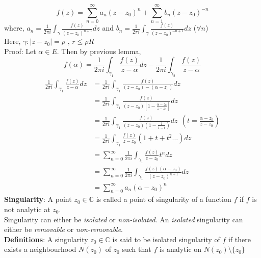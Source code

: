 \begin{equation*}
    f(z)=\sum_{n=0}^{\infty} a_n(z-z_0)^n + \sum_{n=1}^{\infty} b_n(z-z_0)^{-n}
\end{equation*}
where, $a_n=\frac{1}{2\pi i} \int_{\gamma}^{} \frac{f(z)}{(z-z_0)^{n+1}} dz$ and $b_n= \frac{1}{2\pi i} \int_{\gamma}^{} \frac{f(z)}{(z-z_0)^{-n+1}} dz$ ($\forall n$)\\
Here, $\gamma: |z-z_0|=\rho$ , $r\leq \rho R$\\
Proof: Let $\alpha \in E$. Then by previous lemma, \\
\begin{equation*}
    f(\alpha)= \frac{1}{2\pi i} \int_{\gamma_1}^{} \frac{f(z)}{z-\alpha} dz - \frac{1}{2\pi i}\int_{\gamma_2}^{} \frac{f(z)}{z-\alpha}
\end{equation*}
\begin{equation*}
    \begin{split}
        \frac{1}{2\pi i} \int_{\gamma_1}^{} \frac{f(z)}{z-\alpha} dz&= \frac{1}{2\pi i} \int_{\gamma_1}^{} \frac{f(z)}{(z-z_0)-(\alpha-z_0)} dz \\
        &=\frac{1}{2\pi i} \int_{\gamma_1}^{} \frac{f(z)}{(z-z_0)[1-\frac{\alpha-z_0}{z-z_0}]} dz\\
        &=\frac{1}{2\pi i} \int_{\gamma_1}^{} \frac{f(z)}{(z-z_0)(1-\frac{1}{1-t})} dz   \:\: (t=\frac{\alpha-z_0}{z-z_0})\\
        &=\frac{1}{2\pi i} \int_{\gamma_1}^{} \frac{f(z)}{z-z_0} (1+t+t^2\dots ) dz\\
        &=\sum_{n=0}^{\infty} \frac{1}{2\pi i}\int_{\gamma_1}^{} \frac{f(z)}{z-z_0} t^n dz\\
        &=\sum_{n=0}^{\infty} \frac{1}{2\pi i}\int_{\gamma_1}^{} \frac{f(z)(\alpha-z_0)}{(z-z_0)^{n+1}}  dz\\
        &=\sum_{n=0}^{\infty} a_n (\alpha-z_0)^n
    \end{split}
\end{equation*}
\textbf{Singularity}: A point $z_0\in \mathbb{C}$ is called a point of singularity of a function $f$ if $f$ is not analytic at $z_0$.\\
Singularity can either be \emph{isolated} or \emph{non-isolated}. An \emph{isolated} singularity can either be \emph{removable} or \emph{non-removable}.\\
\textbf{Definitions}: A singularity $z_0\in \mathbb{C}$ is said to be isolated singularity of $f$ if there exists a neighbourhood $N(z_0)$ of $z_0$ such that $f$ is analytic on $N(z_0)\setminus \{z_0\}$\\
